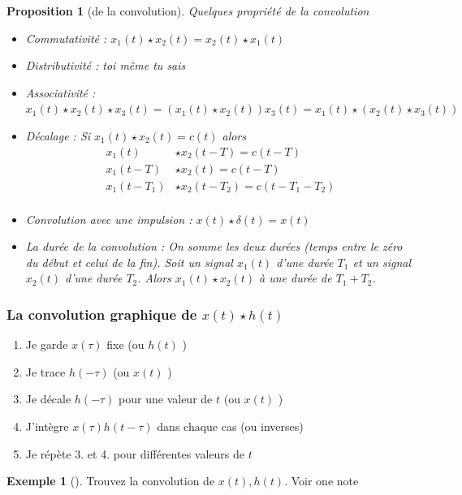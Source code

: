 \documentclass{article}
\theoremstyle{plain}%
\newtheorem{prop}[thm]{Proposition}
\theoremstyle{definition}
\newtheorem{exmp}{Exemple}[section]
\theoremstyle{remark}
\begin{document}
\begin{prop}[de la convolution]
    Quelques propriété de la convolution
    \begin{itemize}
        \item Commutativité : $ x_1(t) \star x_2(t) = x_2(t) \star x_1(t) $ 
        \item Distributivité : toi même tu sais
        \item Associativité : $ x_1(t) \star x_2(t) \star x_3(t) = (x_1(t) \star x_2(t)) x_3(t) = x_1(t) \star (x_2(t) \star x_3(t)) $ 
        \item Décalage : Si $ x_1(t) \star x_2(t) = c(t) $ alors \begin{align*}
            x_1(t) &\star x_2(t-T) = c(t-T) \\
            x_1(t-T) &\star x_2(t) = c(t-T) \\
            x_1(t-T_1) &\star x_2(t-T_2) = c(t-T_1 - T_2) \\
        \end{align*}
        \item Convolution avec une impulsion : $ x(t) \star \delta (t) = x(t) $ 
        \item La durée de la convolution : On somme les deux durées (temps entre le zéro du début et celui de la fin). Soit un signal $ x_1(t) $ d'une durée $ T_1 $ et un signal $ x_2(t) $ d'une durée $ T_2 $. Alors $ x_1(t) \star x_2(t) $ à une durée de $ T_1 + T_2 $. 
    \end{itemize}
\end{prop}

\subsubsection{La convolution graphique de $ x(t) \star h(t) $ }
\begin{enumerate}
    \item Je garde $ x(\tau ) $ fixe (ou $ h(t) $ )
    \item Je trace $ h(-\tau ) $ (ou $ x(t) $ )
    \item Je décale $ h(-\tau ) $ pour une valeur de $ t $ (ou $ x(t) $ )
    \item J'intègre $ x(\tau )h(t -\tau ) $ dans chaque cas (ou inverses)
    \item Je répète 3. et 4. pour différentes valeurs de $ t $ 
\end{enumerate}
\begin{exmp}[]
    Trouvez la convolution de $ x(t), h(t) $. Voir one note
\end{exmp}
\end{document}
